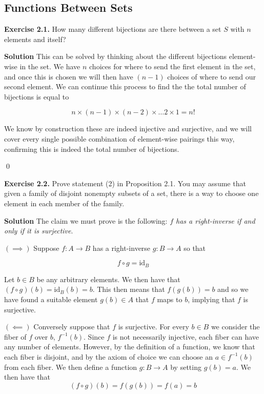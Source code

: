 \documentclass[titlepage]{article}
\begin{document}
\bigskip

\subsection{Functions Between Sets}

\textbf{Exercise 2.1.} How many different bijections are there between a set $S$ with $n$ elements and itself?

\medskip

\textbf{Solution} This can be solved by thinking about the different bijections element-wise in the set. We have $n$ choices for where to send the first element in the set, and once this is chosen we will then have $(n-1)$ choices of where to send our second element. We can continue this process to find the the total number of bijections is equal to 

\[ n \times (n-1) \times (n-2) \times \dots 2 \times 1 = n! \]

We know by construction these are indeed injective and surjective, and we will cover every single possible combination of element-wise pairings this way, confirming this is indeed the total number of bijections.

\qed

\bigskip

\textbf{Exercise 2.2.} Prove statement (2) in Proposition 2.1. You may assume that given a family of disjoint nonempty subsets of a set, there is a way to choose one element in each member of the family.

\medskip

\textbf{Solution} The claim we must prove is the following: \textit{$f$ has a right-inverse if and only if it is surjective}.

$(\implies)$ Suppose $f: A \to B$ has a right-inverse $g:B \to A$ so that

\[ f \circ g = \textrm{id} _B \]

Let $b \in B$ be any arbitrary elements. We then have that $(f \circ g)(b) = \textrm{id}_B (b) = b$. This then means that $f(g(b))=b$ and so we have found a suitable element $g(b) \in A$ that $f$ maps to $b$, implying that $f$ is surjective.

$(\impliedby)$ Conversely suppose that $f$ is surjective. For every $b \in B$ we consider the fiber of $f$ over $b$, $f^{-1}(b)$. Since $f$ is not necessarily injective, each fiber can have any number of elements. However, by the definition of a function, we know that each fiber is disjoint, and by the axiom of choice we can choose an $a \in f^{-1}(b)$ from each fiber. We then define a function $g:B \to A$ by setting $g(b)=a$. We then have that
\[ (f \circ g)(b) = f(g(b)) = f(a) = b \]
\end{document}
